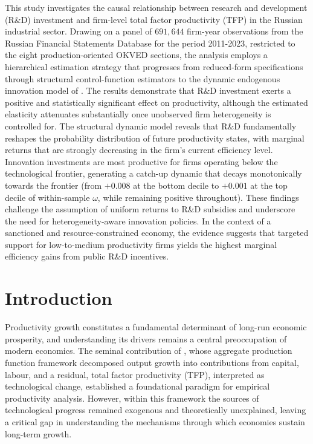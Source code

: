 \documentclass[a4paper, 12pt]{article}
\begin{document}
This study investigates the causal relationship between research and development (R\&D) investment and firm-level total factor productivity (TFP) in the Russian industrial sector. Drawing on a panel of $691{,}644$ firm-year observations from the Russian Financial Statements Database for the period 2011-2023, restricted to the eight production-oriented OKVED sections, the analysis employs a hierarchical estimation strategy that progresses from reduced-form specifications through structural control-function estimators to the dynamic endogenous innovation model of \textcite{doraszelski2013r}. The results demonstrate that R\&D investment exerts a positive and statistically significant effect on productivity, although the estimated elasticity attenuates substantially once unobserved firm heterogeneity is controlled for. The structural dynamic model reveals that R\&D fundamentally reshapes the probability distribution of future productivity states, with marginal returns that are strongly decreasing in the firm's current efficiency level. Innovation investments are most productive for firms operating below the technological frontier, generating a catch-up dynamic that decays monotonically towards the frontier (from $+0.008$ at the bottom decile to $+0.001$ at the top decile of within-sample $\omega$, while remaining positive throughout). These findings challenge the assumption of uniform returns to R\&D subsidies and underscore the need for heterogeneity-aware innovation policies. In the context of a sanctioned and resource-constrained economy, the evidence suggests that targeted support for low-to-medium productivity firms yields the highest marginal efficiency gains from public R\&D incentives.


\section{Introduction}
Productivity growth constitutes a fundamental determinant of long-run economic prosperity, and understanding its drivers remains a central preoccupation of modern economics. The seminal contribution of \textcite{solow1957technical}, whose aggregate production function framework decomposed output growth into contributions from capital, labour, and a residual, total factor productivity (TFP), interpreted as technological change, established a foundational paradigm for empirical productivity analysis. However, within this framework the sources of technological progress remained exogenous and theoretically unexplained, leaving a critical gap in understanding the mechanisms through which economies sustain long-term growth.
\end{document}
